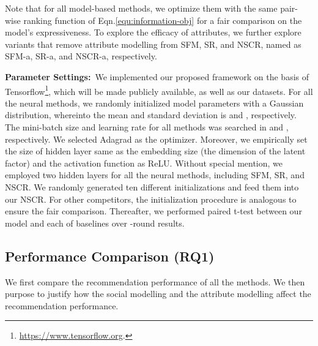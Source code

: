 \documentclass[sigconf]{acmart}
\begin{document}
	\noindent Note that for all model-based methods, we optimize them with the same pair-wise ranking function of Eqn.\eqref{equ:information-obj} for a fair comparison on the model's expressiveness.
	To explore the efficacy of attributes, we further explore variants that remove attribute modelling from SFM, SR, and NSCR, named as SFM-a, SR-a, and NSCR-a, respectively.


	\textbf{Parameter Settings:}~We implemented our proposed framework on the basis of Tensorflow\footnote{\url{https://www.tensorflow.org}.}, which will be made publicly available, as well as our datasets. For all the neural methods, we randomly initialized model parameters with a Gaussian distribution, whereinto the mean and standard deviation is  and , respectively. The mini-batch size and learning rate for all methods was searched in  and , respectively. We selected Adagrad as the optimizer. Moreover, we empirically set the size of hidden layer same as the embedding size (the dimension of the latent factor) and the activation function as ReLU. Without special mention, we employed two hidden layers for all the neural methods, including SFM, SR, and NSCR. We randomly generated ten different initializations and feed them into our NSCR. For other competitors, the initialization procedure is analogous to ensure the fair comparison. Thereafter, we performed paired t-test between our model and each of baselines over -round results.




	








\subsection{Performance Comparison (RQ1)}
We first compare the recommendation performance of all the methods. We then purpose to justify how the social modelling and the attribute modelling affect the recommendation performance.
\end{document}
